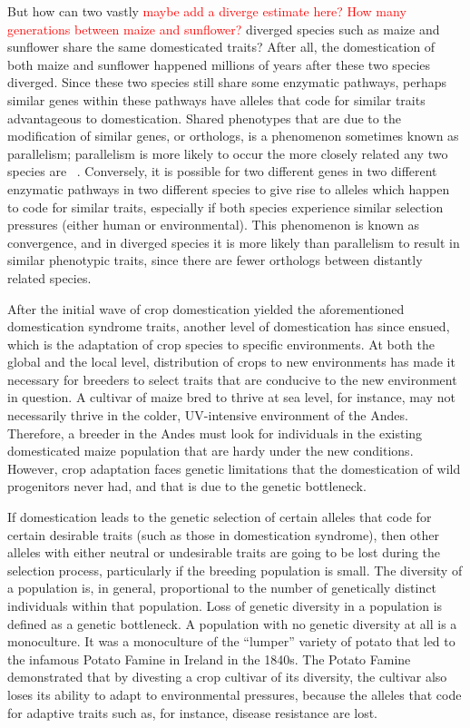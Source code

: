 \documentclass[12pt]{article}
\newcommand{\mbh}[1]{\textcolor{red}{\normalsize  #1}}
\begin{document}
But how can two vastly \mbh{maybe add a diverge estimate here?  How many generations between maize and sunflower?} diverged species such as maize and sunflower share the same domesticated traits? 
After all, the domestication of both maize and sunflower happened millions of years after these two species diverged. Since these two species still share some enzymatic pathways, perhaps similar genes within these pathways have alleles that code for similar traits advantageous to domestication. Shared phenotypes that are due to the modification of similar genes, or orthologs, is a phenomenon sometimes known as parallelism; parallelism is more likely to occur the more closely related any two species are ~\cite{Pickersgill2018}. Conversely, it is possible for two different genes in two different enzymatic pathways in two different species to give rise to alleles which happen to code for similar traits, especially if both species experience similar selection pressures (either human or environmental). This phenomenon is known as convergence, and in diverged species it is more likely than parallelism to result in similar phenotypic traits, since there are fewer orthologs between distantly related species.

After the initial wave of crop domestication yielded the aforementioned domestication syndrome traits, another level of domestication has since ensued, which is the adaptation of crop species to specific environments.  At both the global and the local level, distribution of crops to new environments has made it necessary for breeders to select traits that are conducive to the new environment in question. A cultivar of maize bred to thrive at sea level, for instance, may not necessarily thrive in the colder, UV-intensive environment of the Andes.  Therefore, a breeder in the Andes must look for individuals in the existing domesticated maize population that are hardy under the new conditions. However, crop adaptation faces genetic limitations that the domestication of wild progenitors never had, and that is due to the genetic bottleneck. 

If domestication leads to the genetic selection of certain alleles that code for certain desirable traits (such as those in domestication syndrome), then other alleles with either neutral or undesirable traits are going to be lost during the selection process, particularly if the breeding population is small. The diversity of a population is, in general, proportional to the number of genetically distinct individuals within that population. Loss of genetic diversity in a population is defined as a genetic bottleneck. A population with no genetic diversity at all is a monoculture. It was a monoculture of the “lumper” variety of potato that led to the infamous Potato Famine in Ireland in the 1840s.  The Potato Famine demonstrated that by divesting a crop cultivar of its diversity, the cultivar also loses its ability to adapt to environmental pressures, because the alleles that code for adaptive traits such as, for instance, disease resistance are lost.  
\end{document}
